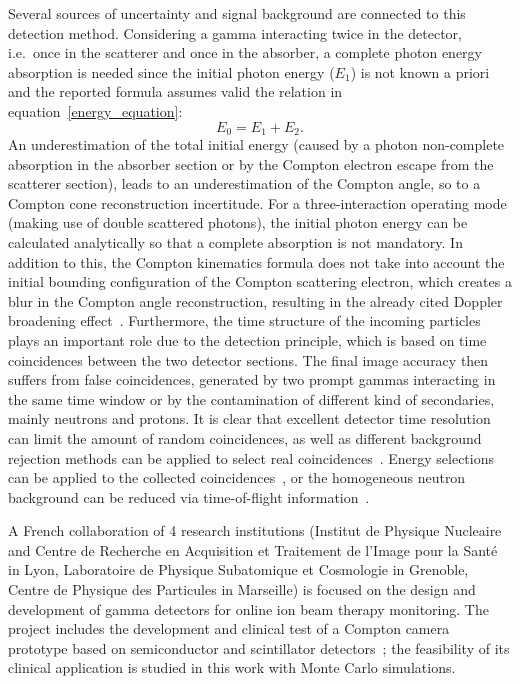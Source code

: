 Several sources of uncertainty and signal background are connected to this detection method. Considering a gamma interacting twice in the detector, i.e.~once in the scatterer and once in the absorber, a complete photon energy absorption is needed since the initial photon energy (\(E_{1}\)) is not known a priori and the reported formula assumes valid the relation in equation~\ref{energy_equation}:
 \begin{equation}
E_{0} = E_{1}+E_{2}.
\label{energy_equation}
\end{equation} 
An underestimation of the total initial energy (caused by a photon non-complete absorption in the absorber section or by the Compton electron escape from the scatterer section), leads to an underestimation of the Compton angle, so to a Compton cone reconstruction incertitude. For a three-interaction operating mode (making use of double scattered photons), the initial photon energy can be calculated analytically so that a complete absorption is not mandatory. In addition to this, the Compton kinematics formula does not take into account the initial bounding configuration of the Compton scattering electron, which creates a blur in the Compton angle reconstruction, resulting in the already cited Doppler broadening effect~\cite{Doppler}. Furthermore, the time structure of the incoming particles plays an important role due to the detection principle, which is based on time coincidences between the two detector sections. The final image accuracy then suffers from false coincidences, generated by two prompt gammas interacting in the same time window or by the contamination of different kind of secondaries, mainly neutrons and protons. It is clear that excellent detector time resolution can limit the amount of random coincidences, as well as different background rejection methods can be applied to select real coincidences~\cite{Draeger:2017aa}. Energy selections can be applied to the collected coincidences~\cite{Polf:2009aa, Hilaire:2016aa}, or the homogeneous neutron background can be reduced via time-of-flight information~\cite{Testa:2010aa}.

A French collaboration of 4 research institutions (Institut de Physique Nucleaire and Centre de Recherche en Acquisition et Traitement de l'Image pour la Sant\'e in Lyon, Laboratoire de Physique Subatomique et Cosmologie in Grenoble, Centre de Physique des Particules in Marseille) is focused on the design and development of gamma detectors for online ion beam therapy monitoring. The project includes the development and clinical test of a Compton camera prototype based on semiconductor and scintillator detectors~\cite{krimmer:hal-01101334}; the feasibility of its clinical application is studied in this work with Monte Carlo simulations.
 
